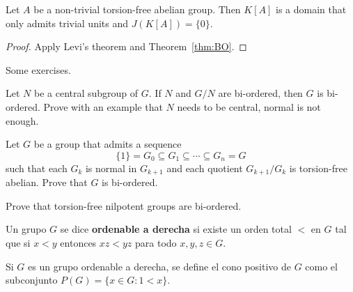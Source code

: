 \begin{corollary}
	Let $A$ be a non-trivial torsion-free abelian group. Then $K[A]$ 
	is a domain that only admits trivial units and $J(K[A])=\{0\}$. 
\end{corollary}

\begin{proof}
	Apply Levi's theorem and Theorem~\ref{thm:BO}.
\end{proof}

Some exercises.

\begin{exercise}
    Let $N$ be a central subgroup of $G$. If $N$ and $G/N$ are bi-ordered, 
    then $G$ is bi-ordered. Prove with an example that $N$ needs to be central, normal 
    is not enough. 
\end{exercise}

\begin{exercise}
    Let $G$ be a group that admits 
    a sequence 
    \[
    \{1\}=G_0\subseteq G_1\subseteq\cdots\subseteq G_n=G
    \]
    such that
    each $G_k$ is normal in $G_{k+1}$ and each quotient $G_{k+1}/G_k$ is 
    torsion-free abelian. Prove that $G$ is bi-ordered.  
\end{exercise}

\begin{exercise}
    Prove that torsion-free nilpotent groups are bi-ordered. 
\end{exercise}



\begin{definition}
	Un grupo $G$ se dice \textbf{ordenable a derecha} si existe un orden total
	$<$ en $G$ tal que si $x<y$ entonces $xz<yz$ para todo $x,y,z\in G$.
\end{definition}

%
%	

Si $G$ es un grupo ordenable a derecha, se define el cono positivo de $G$ como
el subconjunto $P(G)=\{x\in G:1<x\}$. 

